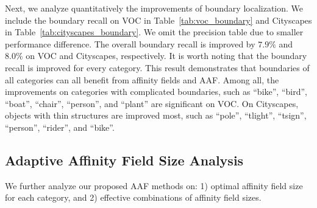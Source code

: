 \begin{table*}[b!]
  \centering
    \vspace{0.5pt}
    \caption{Per-class boundary recall results on Cityscapes validation set.}
    \label{tab:cityscapes_boundary}
\end{table*}

Next, we analyze quantitatively the improvements of boundary localization. We include the boundary recall on VOC in Table~\ref{tab:voc_boundary} and Cityscapes in Table~\ref{tab:cityscapes_boundary}. We omit the precision table due to smaller performance difference. The overall boundary recall is improved by $7.9\%$ and $8.0\%$ on VOC and Cityscapes, respectively. It is worth noting that the boundary recall is improved for every category. This result demonstrates that boundaries of all categories can all benefit from affinity fields and AAF. Among all, the improvements on categories with complicated boundaries, such as ``bike'', ``bird'', ``boat'', ``chair'',  ``person'', and ``plant'' are significant on VOC. On Cityscapes, objects with thin structures are improved most, such as ``pole'', ``tlight'', ``tsign'', ``person'', ``rider'', and ``bike''.

\subsection{Adaptive Affinity Field Size Analysis}
\label{sec:aaf_analysis}
We further analyze our proposed AAF methods on: 1) optimal affinity field size for each category, and 2) effective combinations of affinity field sizes.

